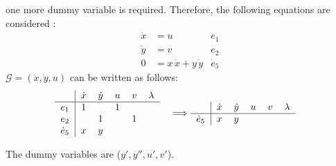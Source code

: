 one more dummy variable is required. Therefore, the following equations are considered :
\begin{align*}
	\dot x &= u & e_1\\
	\dot y &= v & e_2\\
	0 &= x\,\dot x + y\,\dot y & \dot e_5
\end{align*}
$\mathcal{G} = (\dot x,\dot y, u)$ can be written as follows:
\begin{align*}
	\begin{tabular}{c|c c c c c}
		& $\dot x$ & $\dot y$ & $ u$ & $ v$ & $\lambda$ \\
		\hline
		$e_1$ & 1 & & 1 & &\\
		$e_2$ & & 1 & & 1 &\\
		$\dot e_5$ & $x$ & $y$ & & &\\		
	\end{tabular} & & \implies & \begin{tabular}{c|c c c c c}
		& $\dot x$ & $\dot y$ & $u$ & $v$ & $\lambda$ \\
		\hline
		$\dot e_5$ & $x$ & $y$ & & &\\		
	\end{tabular}
\end{align*}

The dummy variables are ($y',y'',u',v'$). 

